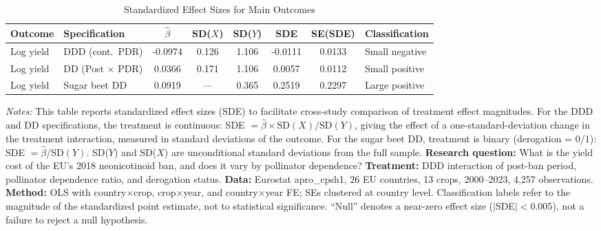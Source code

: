 \begin{table}[H]
\centering
\caption{Standardized Effect Sizes for Main Outcomes}
\label{tab:sde}
\begin{adjustbox}{max width=\textwidth}
\begin{tabular}{llcccccl}
\toprule
Outcome & Specification & $\hat{\beta}$ & SD($X$) & SD($Y$) & SDE & SE(SDE) & Classification \\
\midrule
Log yield & DDD (cont.\ PDR) & -0.0974 & 0.126 & 1.106 & -0.0111 & 0.0133 & Small negative \\
Log yield & DD (Post $\times$ PDR) & 0.0366 & 0.171 & 1.106 & 0.0057 & 0.0112 & Small positive \\
Log yield & Sugar beet DD & 0.0919 & --- & 0.365 & 0.2519 & 0.2297 & Large positive \\
\bottomrule
\end{tabular}
\end{adjustbox}
\par\vspace{0.3em}
{\footnotesize \emph{Notes:} This table reports standardized effect sizes (SDE) to facilitate cross-study comparison of treatment effect magnitudes. For the DDD and DD specifications, the treatment is continuous: SDE $= \hat{\beta} \times \text{SD}(X) / \text{SD}(Y)$, giving the effect of a one-standard-deviation change in the treatment interaction, measured in standard deviations of the outcome. For the sugar beet DD, treatment is binary (derogation = 0/1): SDE $= \hat{\beta} / \text{SD}(Y)$. SD($Y$) and SD($X$) are unconditional standard deviations from the full sample. \textbf{Research question:} What is the yield cost of the EU's 2018 neonicotinoid ban, and does it vary by pollinator dependence? \textbf{Treatment:} DDD interaction of post-ban period, pollinator dependence ratio, and derogation status. \textbf{Data:} Eurostat apro\_cpsh1, 26 EU countries, 13 crops, 2000--2023, 4,257 observations. \textbf{Method:} OLS with country$\times$crop, crop$\times$year, and country$\times$year FE; SEs clustered at country level. Classification labels refer to the magnitude of the standardized point estimate, not to statistical significance. ``Null'' denotes a near-zero effect size ($|$SDE$| < 0.005$), not a failure to reject a null hypothesis.}
\end{table}
